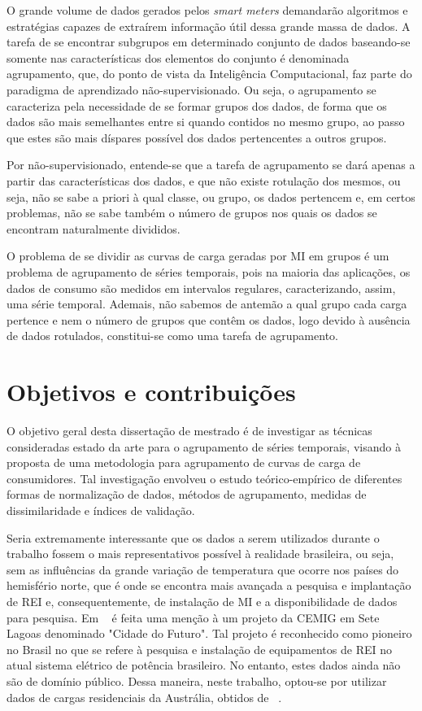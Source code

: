 O grande volume de dados gerados pelos \emph{smart meters} demandarão algoritmos e estratégias capazes de extraírem informação útil dessa grande massa de dados. A tarefa de se encontrar subgrupos em determinado conjunto de dados baseando-se somente nas características dos elementos do conjunto é denominada agrupamento, que, do ponto de vista da Inteligência Computacional, faz parte do paradigma de aprendizado não-supervisionado. Ou seja, o agrupamento se caracteriza pela necessidade de se formar grupos dos dados, de forma que os dados são mais semelhantes entre si quando contidos no mesmo grupo, ao passo que estes são mais díspares possível dos dados pertencentes a outros grupos. 

Por não-supervisionado, entende-se que a tarefa de agrupamento se dará apenas a partir das características dos dados, e que não existe rotulação dos mesmos, ou seja, não se sabe a priori à qual classe, ou grupo, os dados pertencem e, em certos problemas, não se sabe também o número de grupos nos quais os dados se encontram naturalmente divididos.

O problema de se dividir as curvas de carga geradas por MI em grupos é um problema de agrupamento de séries temporais, pois na maioria das aplicações, os dados de consumo são medidos em intervalos regulares, caracterizando, assim, uma série temporal. Ademais, não sabemos de antemão a qual grupo cada carga pertence e nem o número de grupos que contêm os dados, logo devido à ausência de dados rotulados, constitui-se como uma tarefa de agrupamento.

\section{Objetivos e contribuições}

O objetivo geral desta dissertação de mestrado é de investigar as técnicas consideradas estado da arte para o agrupamento de séries temporais, visando à proposta de uma metodologia para agrupamento de curvas de carga de consumidores. Tal investigação envolveu o estudo teórico-empírico de diferentes formas de normalização de dados, métodos de agrupamento, medidas de dissimilaridade e índices de validação.

Seria extremamente interessante que os dados a serem utilizados durante o trabalho fossem o mais representativos possível à realidade brasileira, ou seja, sem as influências da grande variação de temperatura que ocorre nos países do hemisfério norte, que é onde se encontra mais avançada a pesquisa e implantação de REI e, consequentemente, de instalação de MI e a disponibilidade de dados para pesquisa. Em ~\parencite{REI} é feita uma menção à um projeto da CEMIG em Sete Lagoas denominado "Cidade do Futuro". Tal projeto é reconhecido como pioneiro no Brasil no que se refere à pesquisa e instalação de equipamentos de REI no atual sistema elétrico de potência brasileiro. No entanto, estes dados ainda não são de domínio público. Dessa maneira, neste trabalho, optou-se por utilizar dados de cargas residenciais da Austrália, obtidos de ~\parencite{dadosAustralia}.

